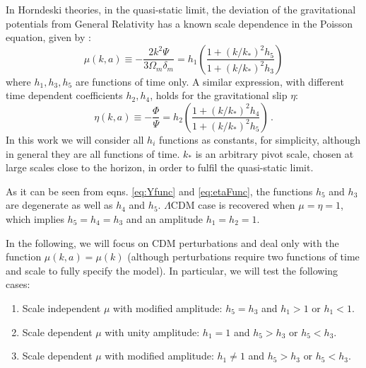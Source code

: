 In Horndeski theories, in the quasi-static limit, the deviation
of the gravitational potentials from General Relativity has a known
scale dependence in the Poisson equation, given by \citep{...}: 
\begin{equation}
\mu(k,a)\equiv-\frac{2k^{2}\Psi}{3\Omega_{m}\delta_{m}}=h_{1}\left(\frac{1+(k/k_{*})^{2}h_{5}}{1+(k/k_{*})^{2}h_{3}}\right)\label{eq:Yfunc}
\end{equation}
where $h_{1},h_{3},h_{5}$ are functions of time only. A similar expression,
with different time dependent coefficients $h_{2},h_{4}$, holds for
the gravitational slip $\eta$: 
\begin{equation}
\eta(k,a)\equiv-\frac{\Phi}{\Psi}=h_{2}\left(\frac{1+(k/k_{*})^{2}h_{4}}{1+(k/k_{*})^{2}h_{5}}\right)\,.\label{eq:etaFunc}
\end{equation}
In this work we will consider all $h_{i}$ functions as constants,
for simplicity, although in general they are all functions of time.
$k_{*}$ is an arbitrary pivot scale, chosen at large scales close
to the horizon, in order to fulfil the quasi-static limit.

As it can be seen from eqns. \ref{eq:Yfunc} and \ref{eq:etaFunc},
the functions $h_{5}$ and $h_{3}$ are degenerate as well as $h_{4}$
and $h_{5}$. %
$\Lambda\textrm{CDM}$ case is recovered when $\mu=\eta=1$, which
implies $h_{5}=h_{4}=h_{3}$ and an amplitude $h_{1}=h_{2}=1$.

In the following, we will focus on CDM perturbations and deal only
with the function $\mu(k,a)=\mu(k)$ (although perturbations require
two functions of time and scale to fully specify the model). In particular,
we will test the following cases: 
\begin{enumerate}
	\item Scale independent $\mu$ with modified amplitude: $h_{5}=h_{3}$ and
	$h_{1}>1$ or $h_{1}<1$. 
	\item Scale dependent $\mu$ with unity amplitude: $h_{1}=1$ and $h_{5}>h_{3}$
	or $h_{5}<h_{3}$. 
	\item Scale dependent $\mu$ with modified amplitude: $h_{1}\neq1$ and
	$h_{5}>h_{3}\mbox{ or }h_{5}<h_{3}$. 
\end{enumerate}


